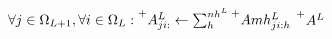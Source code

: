 {\begin{algorithm}[h]
\begin{algorithmic}[1]
    \State $\forall j \in \Omega_{L+1}, \forall i \in \Omega_L: \prescript{+}{}{A^{L}_{ji:}} \gets \sum_h^{nh^L} \prescript{+}{}{Amh^{L}_{ji:h}}$  \label{op:method3_max_alternative_pointwise_relu_this_op_may_be_different}
    \State \Return $\prescript{+}{}{A^{L}}$ 
    \EndProcedure

  \end{algorithmic}
  \end{algorithm}
}



